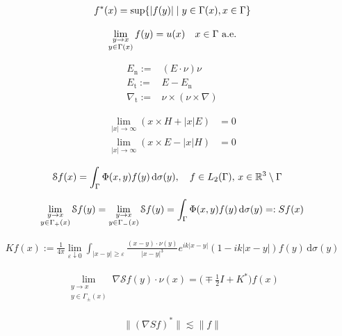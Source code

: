 \begin{align*}
  f^*(x)=\sup\{|f(y)|\mid y\in\Gamma(x),x\in\Gamma\}
\end{align*}

\begin{align*}
  \lim_{\substack{y\to x\\y\in\Gamma(x)}}f(y)=u(x)\quad x\in\Gamma
  \text{ a.e.}
\end{align*}

\begin{align*}
  E_{\text{n}}:=&(E\cdot\nu)\nu \\ 
  E_{\text{t}}:=&E-E_{\text{n}} \\
  \nabla_{\text{t}}:=&\nu\times(\nu\times\nabla)
\end{align*}

\begin{dfn}
  \begin{align*}
    \lim_{|x|\to\infty}(x\times H+|x|E)&=0\\
    \lim_{|x|\to\infty}(x\times E-|x|H)&=0
  \end{align*}
\end{dfn}
 
\begin{align*}
  \mathcal{S}f(x) &= \int_{\Gamma}\Phi(x,y)f(y)\,\text{d}\sigma(y), \quad f\in L_2(\Gamma),\, x\in\mathbb{R}^3\setminus\Gamma 
\end{align*}

\begin{align*}
  \lim_{\substack{y\to x\\y\in\Gamma_+(x)}}\mathcal{S}f(y)=
  \lim_{\substack{y\to x\\y\in\Gamma_-(x)}}\mathcal{S}f(y)=
  \int_{\Gamma}\Phi(x,y)f(y)\,\text{d}\sigma(y)=:Sf(x)
\end{align*}

\begin{align*}
  Kf(x):=\frac{1}{4\pi}\lim_{\varepsilon\downarrow 0}\int_{|x-y|\geqslant
         \varepsilon}\frac{(x-y)\cdot\nu(y)}{|x-y|^3}e^{ik|x-y|}(1-ik|x-y|)f(y)
         \,\text{d}\sigma(y)
\end{align*}

\begin{align*}
  \lim_{\substack{y\to x\\y\in\Gamma_{\pm}(x)}}\nabla\mathcal{S}f(y)
  \cdot\nu(x)=\bigl(\mp\frac{1}{2}I+K^*\bigr)f(x)
\end{align*}
  
\begin{align*}
  \|(\nabla Sf)^*\|\lesssim\|f\|
\end{align*}

